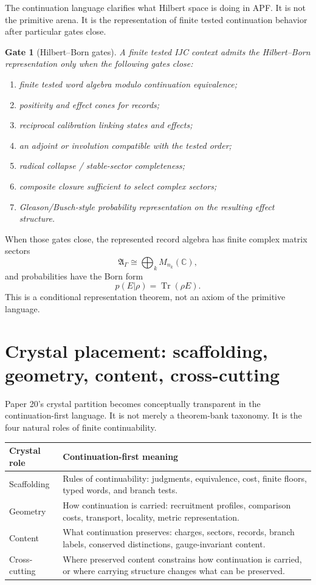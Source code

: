 \documentclass[11pt]{article}
\newtheorem{gate}[theorem]{Gate}
\theoremstyle{remark}
\newcommand{\G}{\Gamma}
\newcommand{\Alg}{\mathfrak A}
\newcommand{\Tr}{\operatorname{Tr}}
\newcommand{\C}{\mathbb C}
\begin{document}
The continuation language clarifies what Hilbert space is doing in APF.  It is not the primitive arena.  It is the representation of finite tested continuation behavior after particular gates close.

\begin{gate}[Hilbert--Born gates]
A finite tested IJC context admits the Hilbert--Born representation only when the following gates close:
\begin{enumerate}
\item finite tested word algebra modulo continuation equivalence;
\item positivity and effect cones for records;
\item reciprocal calibration linking states and effects;
\item an adjoint or involution compatible with the tested order;
\item radical collapse / stable-sector completeness;
\item composite closure sufficient to select complex sectors;
\item Gleason/Busch-style probability representation on the resulting effect structure.
\end{enumerate}
\end{gate}

When those gates close, the represented record algebra has finite complex matrix sectors
\[
        \Alg_\G\cong\bigoplus_k M_{n_k}(\C),
\]
and probabilities have the Born form
\[
        p(E|\rho)=\Tr(\rho E).
\]
This is a conditional representation theorem, not an axiom of the primitive language.

\section{Crystal placement: scaffolding, geometry, content, cross-cutting}

Paper 20's crystal partition becomes conceptually transparent in the continuation-first language.  It is not merely a theorem-bank taxonomy.  It is the four natural roles of finite continuability.

\begin{center}
\begin{tabularx}{\textwidth}{p{}X}
\toprule
\textbf{Crystal role} & \textbf{Continuation-first meaning}\\
\midrule
Scaffolding & Rules of continuability: judgments, equivalence, cost, finite floors, typed words, and branch tests.\\
Geometry & How continuation is carried: recruitment profiles, comparison costs, transport, locality, metric representation.\\
Content & What continuation preserves: charges, sectors, records, branch labels, conserved distinctions, gauge-invariant content.\\
Cross-cutting & Where preserved content constrains how continuation is carried, or where carrying structure changes what can be preserved.\\
\bottomrule
\end{tabularx}
\end{center}
\end{document}
